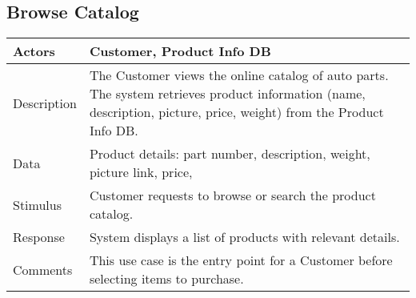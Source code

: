 \documentclass{report}
\begin{document}
    \subsection{Browse Catalog}
    \bigbreak \noindent 
    \begin{center}
        \begin{tabular}{|p{5cm}|p{8cm}|}
            \hline
            Actors & 
            Customer, Product Info DB  \\
            \hline
            Description & 
            The Customer views the online catalog of auto parts. 
            The system retrieves product information (name, description, 
            picture, price, weight) from the Product Info DB. 
             \\
            \hline
            Data & 
            Product details: part number, description, weight, picture link, 
            price, \\
            \hline
            Stimulus & 
            Customer requests to browse or search the product catalog. \\
            \hline
            Response & 
            System displays a list of products with relevant details. \\
            \hline
            Comments & 
            This use case is the entry point for a Customer 
            before selecting items to purchase. \\
            \hline
        \end{tabular}
    \end{center}

    \pagebreak 
\end{document}
